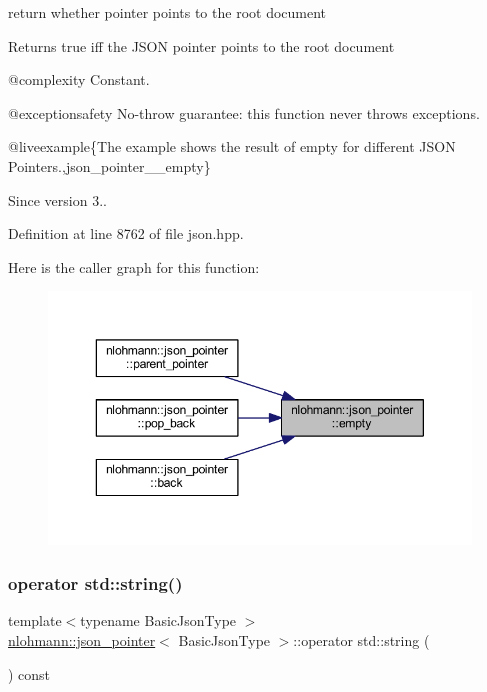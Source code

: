 return whether pointer points to the root document 

\begin{DoxyReturn}{Returns}
true iff the J\+S\+ON pointer points to the root document
\end{DoxyReturn}
@complexity Constant.

@exceptionsafety No-\/throw guarantee\+: this function never throws exceptions.

@liveexample\{The example shows the result of {\ttfamily empty} for different J\+S\+ON Pointers.,json\+\_\+pointer\+\_\+\+\_\+empty\}

\begin{DoxySince}{Since}
version 3.. 
\end{DoxySince}


Definition at line 8762 of file json.\+hpp.

Here is the caller graph for this function\+:
\nopagebreak
\begin{figure}[H]
\begin{center}
\leavevmode
\includegraphics[width=350pt]{classnlohmann_1_1json__pointer_a649252bda4a2e75a0915b11a25d8bcc3_icgraph}
\end{center}
\end{figure}
\mbox{\label{classnlohmann_1_1json__pointer_ae9015c658f99cf3d48a8563accc79988}} 
\subsubsection{\texorpdfstring{operator std::string()}{operator std::string()}}
{\footnotesize\ttfamily template$<$typename Basic\+Json\+Type $>$ \\
\mbox{\hyperlink{classnlohmann_1_1json__pointer}{nlohmann\+::json\+\_\+pointer}}$<$ Basic\+Json\+Type $>$\+::operator std\+::string (\begin{DoxyParamCaption}{ }\end{DoxyParamCaption}) const\hspace{0.3cm}{\ttfamily [inline]}}




